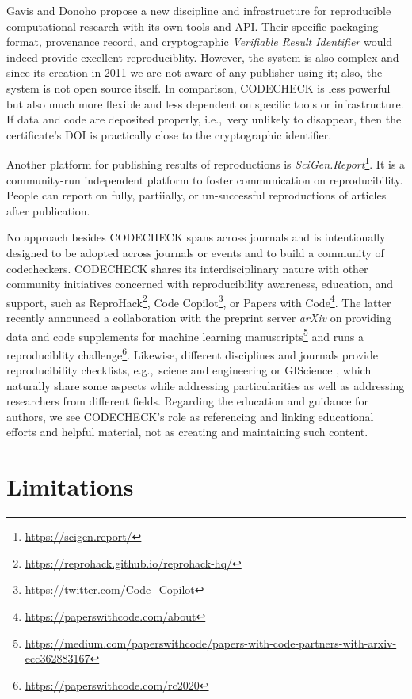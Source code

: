 \documentclass[12pt]{article}
\begin{document}
Gavis and Donoho \cite{gavish_universal_2011} propose a new discipline
and infrastructure for reproducible computational research with its
own tools and API. Their specific packaging format, provenance record,
and cryptographic \emph{Verifiable Result Identifier} would indeed
provide excellent reproduciblity. However, the system is also complex
and since its creation in 2011 we are not aware of any publisher using
it; also, the system is not open source itself.  In comparison,
CODECHECK is less powerful but also much more flexible and less
dependent on specific tools or infrastructure. If data and code are
deposited properly, i.e.,~very unlikely to disappear, then the
certificate's DOI is practically close to the cryptographic
identifier.

Another platform for publishing results of reproductions is
\emph{SciGen.Report}\footnote{\url{https://scigen.report/}}.  It is a
community-run independent platform to foster communication on
reproducibility.  People can report on fully, partiially, or
un-successful reproductions of articles after publication.

No approach besides CODECHECK spans across journals and is
intentionally designed to be adopted across journals or events and to
build a community of codecheckers. CODECHECK shares its
interdisciplinary nature with other community initiatives concerned
with reproducibility awareness, education, and support, such as
ReproHack\footnote{\url{https://reprohack.github.io/reprohack-hq/}},
Code Copilot\footnote{\url{https://twitter.com/Code_Copilot}}, or
Papers with Code\footnote{\url{https://paperswithcode.com/about}}.
The latter recently announced a collaboration with the preprint server
\emph{arXiv} on providing data and code supplements for machine
learning
manuscripts\footnote{\url{https://medium.com/paperswithcode/papers-with-code-partners-with-arxiv-ecc362883167}}
and runs a reproduciblity
challenge\footnote{\url{https://paperswithcode.com/rc2020}}.
Likewise, different disciplines and journals provide reproducibility
checklists, e.g.,~sciene and engineering \cite{rosenberg_next_2020} or
GIScience \cite{nust_agile_2019}, which naturally share some aspects
while addressing particularities as well as addressing researchers
from different fields. Regarding the education and guidance for
authors, we see CODECHECK's role as referencing and linking
educational efforts and helpful material, not as creating and
maintaining such content.

\section*{Limitations}\label{limitations}
\end{document}
